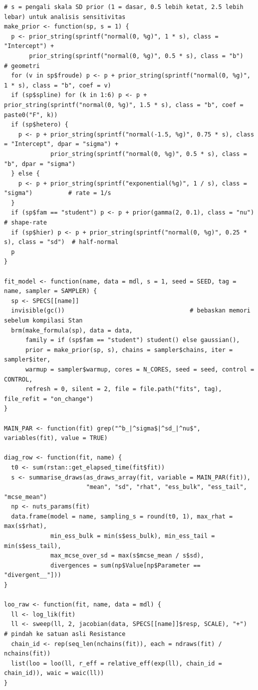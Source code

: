 \documentclass[
]{article}
\begin{document}
\begin{verbatim}
# s = pengali skala SD prior (1 = dasar, 0.5 lebih ketat, 2.5 lebih lebar) untuk analisis sensitivitas
make_prior <- function(sp, s = 1) {
  p <- prior_string(sprintf("normal(0, %g)", 1 * s), class = "Intercept") +
       prior_string(sprintf("normal(0, %g)", 0.5 * s), class = "b")                  # geometri
  for (v in sp$froude) p <- p + prior_string(sprintf("normal(0, %g)", 1 * s), class = "b", coef = v)
  if (sp$spline) for (k in 1:6) p <- p + prior_string(sprintf("normal(0, %g)", 1.5 * s), class = "b", coef = paste0("F", k))
  if (sp$hetero) {
    p <- p + prior_string(sprintf("normal(-1.5, %g)", 0.75 * s), class = "Intercept", dpar = "sigma") +
             prior_string(sprintf("normal(0, %g)", 0.5 * s), class = "b", dpar = "sigma")
  } else {
    p <- p + prior_string(sprintf("exponential(%g)", 1 / s), class = "sigma")          # rate = 1/s
  }
  if (sp$fam == "student") p <- p + prior(gamma(2, 0.1), class = "nu")               # shape-rate
  if (sp$hier) p <- p + prior_string(sprintf("normal(0, %g)", 0.25 * s), class = "sd")  # half-normal
  p
}

fit_model <- function(name, data = mdl, s = 1, seed = SEED, tag = name, sampler = SAMPLER) {
  sp <- SPECS[[name]]
  invisible(gc())                                   # bebaskan memori sebelum kompilasi Stan
  brm(make_formula(sp), data = data,
      family = if (sp$fam == "student") student() else gaussian(),
      prior = make_prior(sp, s), chains = sampler$chains, iter = sampler$iter,
      warmup = sampler$warmup, cores = N_CORES, seed = seed, control = CONTROL,
      refresh = 0, silent = 2, file = file.path("fits", tag), file_refit = "on_change")
}

MAIN_PAR <- function(fit) grep("^b_|^sigma$|^sd_|^nu$", variables(fit), value = TRUE)

diag_row <- function(fit, name) {
  t0 <- sum(rstan::get_elapsed_time(fit$fit))
  s <- summarise_draws(as_draws_array(fit, variable = MAIN_PAR(fit)),
                       "mean", "sd", "rhat", "ess_bulk", "ess_tail", "mcse_mean")
  np <- nuts_params(fit)
  data.frame(model = name, sampling_s = round(t0, 1), max_rhat = max(s$rhat),
             min_ess_bulk = min(s$ess_bulk), min_ess_tail = min(s$ess_tail),
             max_mcse_over_sd = max(s$mcse_mean / s$sd),
             divergences = sum(np$Value[np$Parameter == "divergent__"]))
}

loo_raw <- function(fit, name, data = mdl) {
  ll <- log_lik(fit)
  ll <- sweep(ll, 2, jacobian(data, SPECS[[name]]$resp, SCALE), "+")   # pindah ke satuan asli Resistance
  chain_id <- rep(seq_len(nchains(fit)), each = ndraws(fit) / nchains(fit))
  list(loo = loo(ll, r_eff = relative_eff(exp(ll), chain_id = chain_id)), waic = waic(ll))
}


\end{verbatim}
\end{document}
